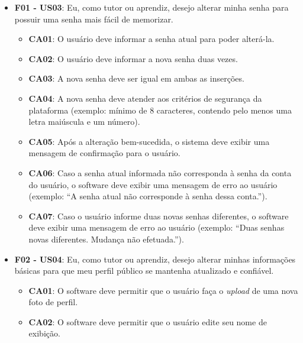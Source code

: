 \begin{itemize}
\begin{itemize}
\end{itemize}

\item \textbf{F01 - US03}: Eu, como tutor ou aprendiz, desejo alterar minha senha para possuir uma senha mais fácil de memorizar.

\begin{itemize}

\item \textbf{CA01}: O usuário deve informar a senha atual para poder alterá-la.

\item \textbf{CA02}: O usuário deve informar a nova senha duas vezes.

\item \textbf{CA03}: A nova senha deve ser igual em ambas as inserções.

\item \textbf{CA04}: A nova senha deve atender aos critérios de segurança da plataforma (exemplo: mínimo de 8 caracteres, contendo pelo menos uma letra maiúscula e um número).

\item \textbf{CA05}: Após a alteração bem-sucedida, o sistema deve exibir uma mensagem de confirmação para o usuário.

\item \textbf{CA06}: Caso a senha atual informada não corresponda à senha da conta do usuário, o software deve exibir uma mensagem de erro ao usuário (exemplo: ``A senha atual não corresponde à senha dessa conta.'').

\item \textbf{CA07}: Caso o usuário informe duas novas senhas diferentes, o software deve exibir uma mensagem de erro ao usuário (exemplo: ``Duas senhas novas diferentes. Mudança não efetuada.'').

\end{itemize}

\item \textbf{F02 - US04}: Eu, como tutor ou aprendiz, desejo alterar minhas informações básicas para que meu perfil público se mantenha atualizado e confiável.

\begin{itemize}

\item \textbf{CA01}: O software deve permitir que o usuário faça o \textit{upload} de uma nova foto de perfil.

\item \textbf{CA02}: O software deve permitir que o usuário edite seu nome de exibição.


\end{itemize}
\end{itemize}
